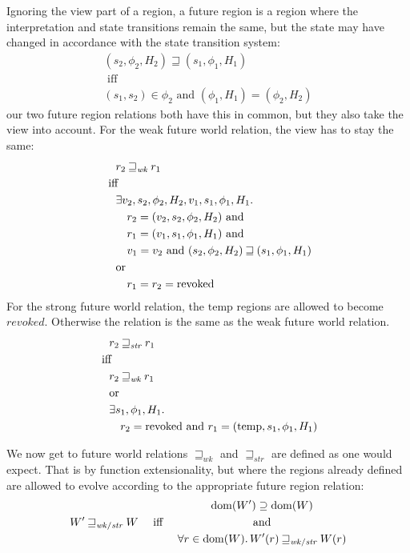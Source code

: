 \documentclass{article}
\DeclareMathOperator{\dom}{dom}
\newcommand{\var}[1]{\mathit{#1}}
\newcommand{\future}{\mathbin{\sqsupseteq}}
\newcommand{\futurewk}{\mathbin{\sqsupseteq}_{\var{wk}}}
\newcommand{\futurestr}{\mathbin{\sqsupseteq}_{\var{str}}}
\newcommand{\plainview}[1]{\mathrm{#1}}
\newcommand{\temp}{\plainview{temp}}
\newcommand{\revoked}{\plainview{revoked}}
\begin{document}
Ignoring the view part of a region, a future region is a region where the interpretation and state transitions remain the same, but the state may have changed in accordance with the state transition system: 
\begin{gather*}
  (s_2,\phi_2,H_2) \future (s_1,\phi_1,H_1) \\
  \text{ iff } \\ 
  (s_1,s_2) \in \phi_2 \text{ and } (\phi_1,H_1) = (\phi_2,H_2)
\end{gather*}
our two future region relations both have this in common, but they also take the view into account. For the weak future world relation, the view has to stay the same:
\begin{align*}
  &\quad r_2 \futurewk r_1 \\
  &\text{ iff } \\ 
  &\quad\exists v_2,s_2,\phi_2,H_2,v_1,s_1,\phi_1,H_1\ldotp\\
  &\qquad      r_2 = (v_2,s_2,\phi_2,H_2) \text{ and } \\
  &\qquad r_1=(v_1,s_1,\phi_1,H_1) \text{ and }\\
  &\qquad v_1 = v_2 \text{ and } (s_2,\phi_2,H_2) \future (s_1,\phi_1,H_1)\\
  &\quad \text{or} \\ 
  &\qquad r_1 = r_2 = \revoked
\end{align*}
For the strong future world relation, the $\temp$ regions are allowed to become $revoked$. Otherwise the relation is the same as the weak future world relation.
\begin{align*}
  &\quad r_2 \futurestr r_1 \\
  &\text{ iff } \\ 
  &\quad r_2 \futurewk r_1 \\
  &\quad\text{or} \\ 
  &\quad\exists s_1,\phi_1,H_1\ldotp\\
  &\qquad r_2 = \revoked \text{ and } r_1 = (\temp,s_1,\phi_1,H_1)
\end{align*}

We now get to future world relations $\futurewk$ and $\futurestr$ are defined as one would expect. That is by function extensionality, but where the regions already defined are allowed to evolve according to the appropriate future region relation:
 \begin{align*}
 W' \future_{\var{wk}/\var{str}} W & & \text{ iff } & &
   \begin{gathered}
     \dom(W') \supseteq \dom(W)\\ 
     \text{ and } \\
     \forall r \in \dom(W) \ldotp W'(r) \future_{\var{wk}/\var{str}} W(r)
   \end{gathered}
 \end{align*}
\end{document}
